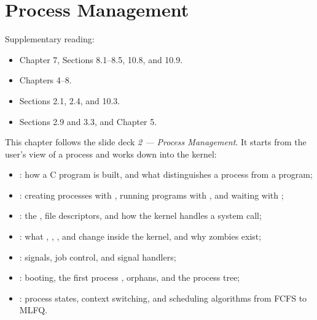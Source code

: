 \chapter{Process Management}
\label{ch:proc}

Supplementary reading:
\begin{itemize}
  \item \cite{CSAPP} Chapter 7, Sections 8.1--8.5, 10.8, and 10.9.
  \item \cite{OSTEP} Chapters 4--8.
  \item \cite{MOS} Sections 2.1, 2.4, and 10.3.
  \item \cite{OSC} Sections 2.9 and 3.3, and Chapter 5.
\end{itemize}

This chapter follows the slide deck \emph{2 --- Process Management}. It starts from the user's view of a process and works down into the kernel:
\begin{itemize}
  \item {}: how a C program is built, and what distinguishes a process from a program;
  \item {}: creating processes with , running programs with , and waiting with ;
  \item {}: the \ts{}, file descriptors, and how the kernel handles a system call;
  \item {}: what , , , and  change inside the kernel, and why zombies exist;
  \item {}: signals, job control, and signal handlers;
  \item {}: booting, the first process , orphans, and the process tree;
  \item {}: process states, context switching, and scheduling algorithms from FCFS to MLFQ.
\end{itemize}








